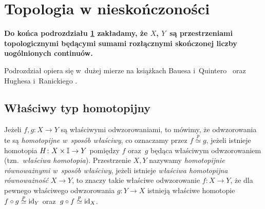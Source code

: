 \section{Topologia w nieskończoności}\label{sec-top_w_nsk}
\textbf{Do końca podrozdziału \ref{sec-top_w_nsk} zakładamy, że $X$, $Y$~są przestrzeniami topologicznymi będącymi sumami rozłącznymi skończonej liczby uogólnionych continuów.} 

Podrozdział opiera się w~dużej mierze na książkach Bauesa i~Quintero~\cite{Baues01} oraz Hughesa i~Ranickiego \cite{Hughes96}.

\subsection{Właściwy typ homotopijny}
Jeżeli $f,g\colon X\to Y$ są właściwymi odwzorowaniami, to mówimy, że odwzorowania te są \textit{homotopijne w~sposób właściwy}, co oznaczamy przez $f\overset{p}{\simeq} g$, jeżeli istnieje homotopia $H\colon X\times \mathbb{I}\to Y$ pomiędzy $f$ oraz~$g$ będąca właściwym odwzorowaniem (tzn.~\textit{właściwa homotopia}). Przestrzenie $X,Y$ nazywamy \textit{homotopijnie równoważnymi w~sposób właściwy}, jeżeli istnieje \textit{właściwa homotopijna równoważność} $X\to Y$, to znaczy takie właściwe odwzorowanie $f\colon X\to Y$, że dla pewnego właściwego odwzorowania $g\colon Y\to X$ istnieją właściwe homotopie $f\circ g\overset{p}{\simeq}\operatorname{id}_Y$ oraz~$g\circ f\overset{p}{\simeq}\operatorname{id}_X$.

